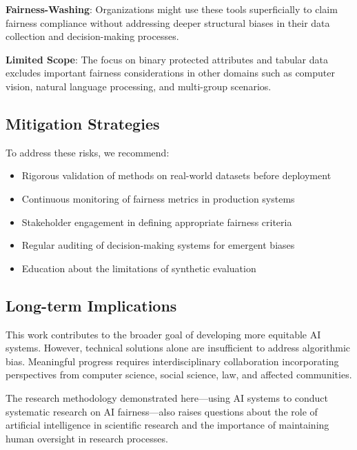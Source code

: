 \textbf{Fairness-Washing}: Organizations might use these tools superficially to claim fairness compliance without addressing deeper structural biases in their data collection and decision-making processes.

\textbf{Limited Scope}: The focus on binary protected attributes and tabular data excludes important fairness considerations in other domains such as computer vision, natural language processing, and multi-group scenarios.

\subsection*{Mitigation Strategies}

To address these risks, we recommend:

\begin{itemize}
\item Rigorous validation of methods on real-world datasets before deployment
\item Continuous monitoring of fairness metrics in production systems
\item Stakeholder engagement in defining appropriate fairness criteria
\item Regular auditing of decision-making systems for emergent biases
\item Education about the limitations of synthetic evaluation
\end{itemize}

\subsection*{Long-term Implications}

This work contributes to the broader goal of developing more equitable AI systems. However, technical solutions alone are insufficient to address algorithmic bias. Meaningful progress requires interdisciplinary collaboration incorporating perspectives from computer science, social science, law, and affected communities.

The research methodology demonstrated here—using AI systems to conduct systematic research on AI fairness—also raises questions about the role of artificial intelligence in scientific research and the importance of maintaining human oversight in research processes.